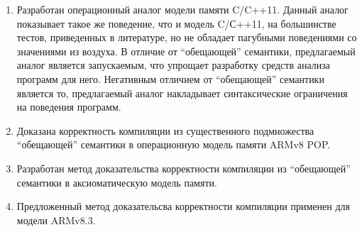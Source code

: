 \begin{enumerate}
  \item Разработан операционный аналог модели памяти C/C++11.
    Данный аналог показывает такое же поведение, что и модель C/С++11, на большинстве
    тестов, приведенных в литературе, но не обладает пагубными поведениями со значениями из воздуха.
    В отличие от ``обещающей'' семантики, предлагаемый аналог является запускаемым, что упрощает
    разработку средств анализа программ для него. Негативным отличием от ``обещающей'' семантики является то,
    предлагаемый аналог накладывает синтаксические ограничения на поведения программ.
  \item Доказана корректность компиляции из существенного подмножества ``обещающей'' семантики в операционную модель
    памяти ARMv8 POP.
  \item Разработан метод доказательства корректности компиляции из ``обещающей'' семантики в аксиоматическую модель
    памяти.
  \item Предложенный метод доказательсва корректности компиляции применен для модели ARMv8.3.
\end{enumerate}
